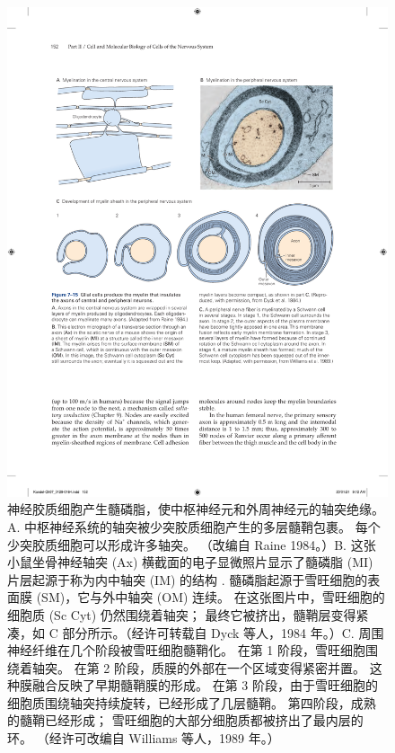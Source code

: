 \begin{figure}[htbp]
	\centering
	\includegraphics[width=1.0\linewidth]{chap07/fig_7_15}
	\caption{神经胶质细胞产生髓磷脂，使中枢神经元和外周神经元的轴突绝缘。 A. 中枢神经系统的轴突被少突胶质细胞产生的多层髓鞘包裹。 每个少突胶质细胞可以形成许多轴突。 （改编自 Raine 1984。）B. 这张小鼠坐骨神经轴突 (Ax) 横截面的电子显微照片显示了髓磷脂 (MI) 片层起源于称为内中轴突 (IM) 的结构 . 髓磷脂起源于雪旺细胞的表面膜 (SM)，它与外中轴突 (OM) 连续。 在这张图片中，雪旺细胞的细胞质 (Sc Cyt) 仍然围绕着轴突； 最终它被挤出，髓鞘层变得紧凑，如 C 部分所示。（经许可转载自 Dyck 等人，1984 年。）C. 周围神经纤维在几个阶段被雪旺细胞髓鞘化。 在第 1 阶段，雪旺细胞围绕着轴突。 在第 2 阶段，质膜的外部在一个区域变得紧密并置。 这种膜融合反映了早期髓鞘膜的形成。 在第 3 阶段，由于雪旺细胞的细胞质围绕轴突持续旋转，已经形成了几层髓鞘。 第四阶段，成熟的髓鞘已经形成； 雪旺细胞的大部分细胞质都被挤出了最内层的环。 （经许可改编自 Williams 等人，1989 年。）}
	\label{fig:7_15}
\end{figure}


